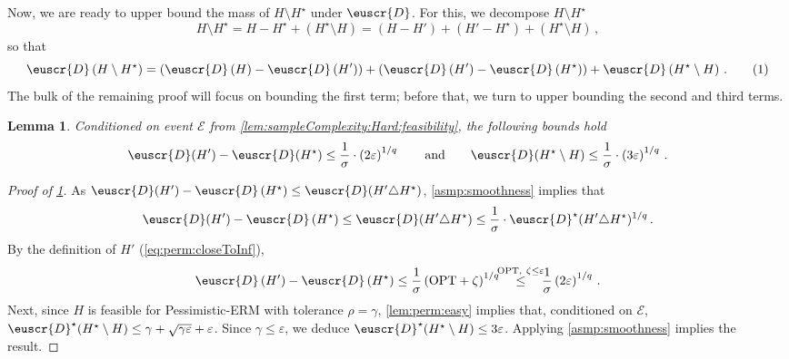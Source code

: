 \documentclass[11pt]{article}
\theoremstyle{plain}
\newtheorem{lemma}[theorem]{Lemma}
\theoremstyle{definition}
\theoremstyle{remark}
\newcommand{\yesnum}{\addtocounter{equation}{1}\tag{\theequation}}
\newcommand{\Stackrel}[2]{\stackrel{\mathmakebox[\widthof{\ensuremath{#2}}]{#1}}{#2}}
\newcommand{\qquadtext}[1]{\qquad\text{#1}\qquad}
\newcommand{\qquadand}{\qquadtext{and}}
\newcommand{\sinparen}[1]{(#1)}
\newcommand{\inparen}[1]{\left(#1\right)}
\newcommand{\evE}{\ensuremath{\mathscr{E}}}
\newcommand{\sfrac}[2]{{#1/#2}}
\newcommand{\opt}{\ensuremath{\mathrm{OPT}}}
\newcommand{\eps}{\varepsilon}
\newcommand{\customcal}[1]{\euscr{#1}}
\newcommand{\cD}{\customcal{D}}
\newcommand{\pERM}{Pessimistic-ERM}
\newcommand{\optset}{{H^\star}}
\newcommand{\cDtrue}{\cD^\star}
\newcommand{\cDgiven}{\cD}
\begin{document}
            Now, we are ready to upper bound the mass of $H\setminus \optset$ under $\cDgiven$.
            For this, we decompose $H\setminus \optset$
            \[
                H\setminus \optset 
                    = H - \optset + \inparen{\optset \setminus H}
                    = \inparen{H - H'} 
                        + \inparen{H' - \optset} 
                        + \inparen{\optset \setminus H}\,,
            \]
            so that 
            \[
                \cDgiven\inparen{H\setminus \optset}
                    = \inparen{
                        \cDgiven\inparen{H} -    \cDgiven\inparen{H'}
                      } + 
                      \inparen{
                        \cDgiven\inparen{H'} - \cDgiven\inparen{\optset}
                      } +
                      \cDgiven\inparen{{\optset \setminus H}}\,.
                    \yesnum\label{eq:sampleComplexity:decomposition}
            \]
            The bulk of the remaining proof will focus on bounding the first term; before that, we turn to upper bounding the second and third terms. 
            \begin{lemma}
                \label{lem:sampleComplexity:Hard:UBterms23}
                Conditioned on event $\evE$ from \cref{lem:sampleComplexity:Hard:feasibility}, the following bounds hold
                \[
                    \cD(H') - \cD(\optset) \leq \frac{1}{\sigma}\cdot \inparen{2\eps}^{\sfrac{1}{q}} 
                    \qquadand
                    \cD(\optset\setminus H)
                    \leq \frac{1}{\sigma}\cdot\inparen{3\eps}^{1/q}\,.
                \]
            \end{lemma}
            \begin{proof}[Proof of \cref{lem:sampleComplexity:Hard:UBterms23}]
                As $\cDgiven\sinparen{H'} - \cDgiven\inparen{\optset}\leq \cDgiven\sinparen{H'\triangle \optset}$, \cref{asmp:smoothness} implies that 
                \[
                    \cDgiven\sinparen{H'} - \cDgiven\inparen{\optset}
                    \leq \cDgiven\sinparen{H'\triangle \optset}
                    \leq \frac{1}{\sigma}\cdot \cDtrue\sinparen{H'\triangle \optset}^{\sfrac{1}{q}}
                    \,.
                \]
                By the definition of $H'$ (\cref{eq:perm:closeToInf}), 
                \[
                    \cDgiven\inparen{H'} - \cDgiven\inparen{\optset}
                    \leq \frac{1}{\sigma} \inparen{\opt+{ \zeta }}^{\sfrac{1}{q}}
                    \quad\Stackrel{\opt,~\zeta\leq \eps}{\leq}\quad \frac{1}{\sigma}\inparen{2\eps}^{1/q}\,.
                \]
                Next, since $H$ is feasible for \pERM{} with tolerance $\rho=\gamma$, \cref{lem:perm:easy} implies that, conditioned on $\evE$, $\cDtrue(\optset\setminus H)\leq \gamma +\sqrt{\gamma\eps}+\eps$.
                Since $\gamma\leq \eps$, we deduce $\cDtrue(\optset\setminus H)\leq 3\eps$.
                Applying \cref{asmp:smoothness} implies the result.
            \end{proof} 
\end{document}
